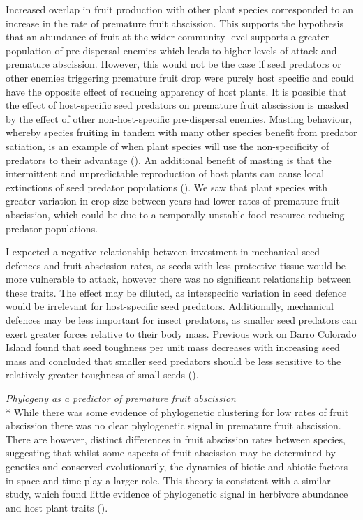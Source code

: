  Increased overlap in fruit production with other plant species corresponded to an increase in the rate of premature fruit abscission. This supports the hypothesis that an abundance of fruit at the wider community-level supports a greater population of pre-dispersal enemies which leads to higher levels of attack and premature abscission. However, this would not be the case if seed predators or other enemies triggering premature fruit drop were purely host specific and could have the opposite effect of reducing apparency of host plants. It is possible that the effect of host-specific seed predators on premature fruit abscission is masked by the effect of other non-host-specific pre-dispersal enemies. Masting behaviour, whereby species fruiting in tandem with many other species benefit from predator satiation, is an example of when plant species will use the non-specificity of predators to their advantage (\cite{kellyEvolutionaryEcologyMast1994}). An additional benefit of masting is that the intermittent and unpredictable reproduction of host plants can cause local extinctions of seed predator populations (\cite{satakeSpatialDynamicsSpecialist2004,yasakaMastingBehaviorFagus2003}). We saw that plant species with greater variation in crop size between years had lower rates of premature fruit abscission, which could be due to a temporally unstable food resource reducing predator populations.

I expected a negative relationship between investment in mechanical seed defences and fruit abscission rates, as seeds with less protective tissue would be more vulnerable to attack, however there was no significant relationship between these traits. The effect may be diluted, as interspecific variation in seed defence would be irrelevant for host-specific seed predators. Additionally, mechanical defences may be less important for insect predators, as smaller seed predators can exert greater forces relative to their body mass. Previous work on Barro Colorado Island found that seed toughness per unit mass decreases with increasing seed mass and concluded that smaller seed predators should be less sensitive to the relatively greater toughness of small seeds (\cite{frickeMechanicalDefenceAdvantage2016}).

\emph{Phylogeny as a predictor of premature fruit abscission}\\*
While there was some evidence of phylogenetic clustering for low rates of fruit abscission there was no clear phylogenetic signal in premature fruit abscission. There are however, distinct differences in fruit abscission rates between species, suggesting that whilst some aspects of fruit abscission may be determined by genetics and conserved evolutionarily, the dynamics of biotic and abiotic factors in space and time play a larger role. This theory is consistent with a similar study, which found little evidence of phylogenetic signal in herbivore abundance and host plant traits (\cite{whitfeldPredictingTropicalInsect2012}).

